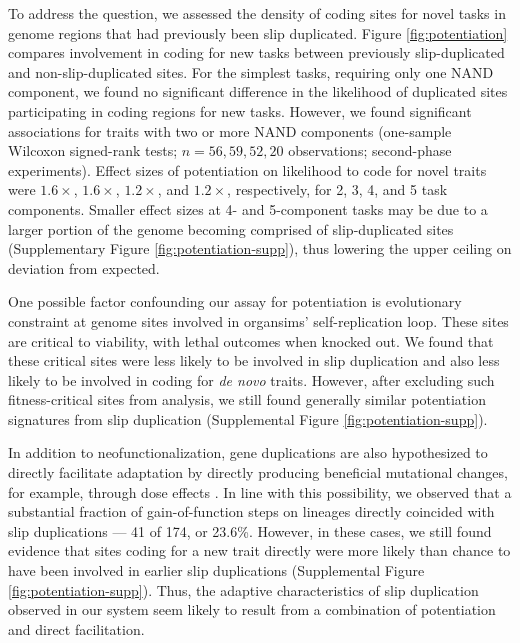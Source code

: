 To address the question, we assessed the density of coding sites for novel tasks in genome regions that had previously been slip duplicated.
Figure \ref{fig:potentiation} compares involvement in coding for new tasks between previously slip-duplicated and non-slip-duplicated sites.
For the simplest tasks, requiring only one NAND component, we found no significant difference in the likelihood of duplicated sites participating in coding regions for new tasks.
However, we found significant associations for traits with two or more NAND components (one-sample Wilcoxon signed-rank tests; $n=56,59,52,20$ observations; second-phase experiments).
Effect sizes of potentiation on likelihood to code for novel traits were $1.6\times$, $1.6\times$, $1.2\times$, and $1.2\times$, respectively, for 2, 3, 4, and 5 task components.
Smaller effect sizes at 4- and 5-component tasks may be due to a larger portion of the genome becoming comprised of slip-duplicated sites (Supplementary Figure \ref{fig:potentiation-supp}), thus lowering the upper ceiling on deviation from expected.

One possible factor confounding our assay for potentiation is evolutionary constraint at genome sites involved in organsims' self-replication loop.
These sites are critical to viability, with lethal outcomes when knocked out.
We found that these critical sites were less likely to be involved in slip duplication and also less likely to be involved in coding for \textit{de novo} traits.
However, after excluding such fitness-critical sites from analysis, we still found generally similar potentiation signatures from slip duplication (Supplemental Figure \ref{fig:potentiation-supp}).

In addition to neofunctionalization, gene duplications are also hypothesized to directly facilitate adaptation by directly producing beneficial mutational changes, for example, through dose effects \citep{kondrashov2012gene}.
In line with this possibility, we observed that a substantial fraction of gain-of-function steps on lineages directly coincided with slip duplications --- 41 of 174, or 23.6\%.
However, in these cases, we still found evidence that sites coding for a new trait directly were more likely than chance to have been involved in earlier slip duplications (Supplemental Figure \ref{fig:potentiation-supp}).
Thus, the adaptive characteristics of slip duplication observed in our system seem likely to result from a combination of potentiation and direct facilitation.

